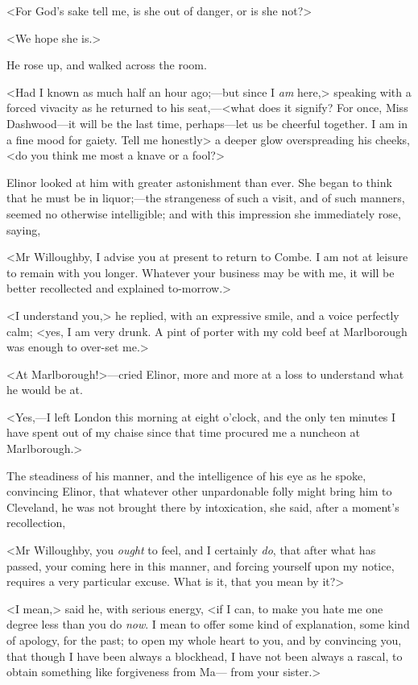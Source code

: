 <For God's sake tell me, is she out of danger, or is she not?>

<We hope she is.>

He rose up, and walked across the room.

<Had I known as much half an hour ago;—but since I \textit{am} here,> speaking with a forced vivacity as he returned to his seat,—<what does it signify? For once, Miss Dashwood—it will be the last time, perhaps—let us be cheerful together. I am in a fine mood for gaiety. Tell me honestly> a deeper glow overspreading his cheeks, <do you think me most a knave or a fool?>

Elinor looked at him with greater astonishment than ever. She began to think that he must be in liquor;—the strangeness of such a visit, and of such manners, seemed no otherwise intelligible; and with this impression she immediately rose, saying,

<Mr Willoughby, I advise you at present to return to Combe. I am not at leisure to remain with you longer. Whatever your business may be with me, it will be better recollected and explained to-morrow.>

<I understand you,> he replied, with an expressive smile, and a voice perfectly calm; <yes, I am very drunk. A pint of porter with my cold beef at Marlborough was enough to over-set me.>

<At Marlborough!>—cried Elinor, more and more at a loss to understand what he would be at.

<Yes,—I left London this morning at eight o'clock, and the only ten minutes I have spent out of my chaise since that time procured me a nuncheon at Marlborough.>

The steadiness of his manner, and the intelligence of his eye as he spoke, convincing Elinor, that whatever other unpardonable folly might bring him to Cleveland, he was not brought there by intoxication, she said, after a moment's recollection,

<Mr Willoughby, you \textit{ought} to feel, and I certainly \textit{do}, that after what has passed, your coming here in this manner, and forcing yourself upon my notice, requires a very particular excuse. What is it, that you mean by it?>

<I mean,> said he, with serious energy, <if I can, to make you hate me one degree less than you do \textit{now}. I mean to offer some kind of explanation, some kind of apology, for the past; to open my whole heart to you, and by convincing you, that though I have been always a blockhead, I have not been always a rascal, to obtain something like forgiveness from Ma— from your sister.>

